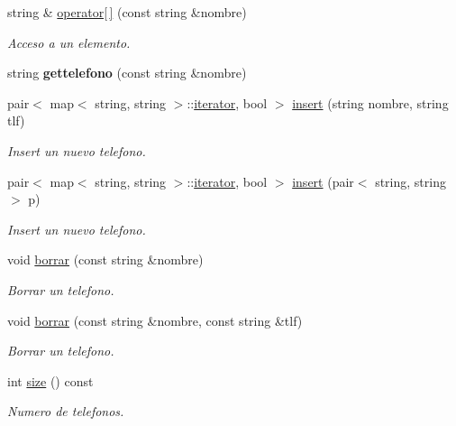 \begin{DoxyCompactItemize}
\item 
string \& \hyperlink{classGuia__Tlf_ab2c734a7f3f3cd63ad95f525502474ea}{operator\mbox{[}$\,$\mbox{]}} (const string \&nombre)
\begin{DoxyCompactList}\small\item\em Acceso a un elemento. \end{DoxyCompactList}\item 
\mbox{\label{classGuia__Tlf_a18593e3cf273db1a540cba69f87fd637}} 
string {\bfseries gettelefono} (const string \&nombre)
\item 
pair$<$ map$<$ string, string $>$\+::\hyperlink{classGuia__Tlf_1_1iterator}{iterator}, bool $>$ \hyperlink{classGuia__Tlf_add78a6fe5e8090ad6f71bbb160b70f77}{insert} (string nombre, string tlf)
\begin{DoxyCompactList}\small\item\em Insert un nuevo telefono. \end{DoxyCompactList}\item 
pair$<$ map$<$ string, string $>$\+::\hyperlink{classGuia__Tlf_1_1iterator}{iterator}, bool $>$ \hyperlink{classGuia__Tlf_a4c4e4cc9540896434edd915296e56c87}{insert} (pair$<$ string, string $>$ p)
\begin{DoxyCompactList}\small\item\em Insert un nuevo telefono. \end{DoxyCompactList}\item 
void \hyperlink{classGuia__Tlf_a57e32bbc9e76567d22e5275d4d2a6515}{borrar} (const string \&nombre)
\begin{DoxyCompactList}\small\item\em Borrar un telefono. \end{DoxyCompactList}\item 
void \hyperlink{classGuia__Tlf_af8adac24fd35985b9016a4a38cca60f4}{borrar} (const string \&nombre, const string \&tlf)
\begin{DoxyCompactList}\small\item\em Borrar un telefono. \end{DoxyCompactList}\item 
int \hyperlink{classGuia__Tlf_a727ab46d490b4196a71f623644906a81}{size} () const
\begin{DoxyCompactList}\small\item\em Numero de telefonos. \end{DoxyCompactList}\item 

\end{DoxyCompactItemize}
